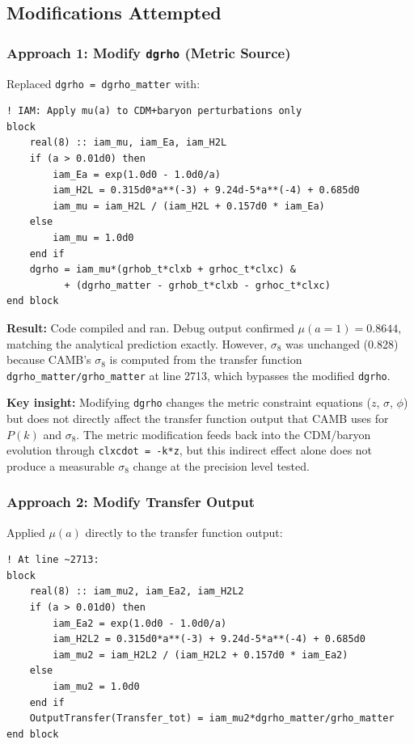 \documentclass[11pt,letterpaper]{article}
\begin{document}
\subsection{Modifications Attempted}

\subsubsection{Approach 1: Modify \texttt{dgrho} (Metric Source)}

Replaced \texttt{dgrho = dgrho\_matter} with:

\begin{lstlisting}
! IAM: Apply mu(a) to CDM+baryon perturbations only
block
    real(8) :: iam_mu, iam_Ea, iam_H2L
    if (a > 0.01d0) then
        iam_Ea = exp(1.0d0 - 1.0d0/a)
        iam_H2L = 0.315d0*a**(-3) + 9.24d-5*a**(-4) + 0.685d0
        iam_mu = iam_H2L / (iam_H2L + 0.157d0 * iam_Ea)
    else
        iam_mu = 1.0d0
    end if
    dgrho = iam_mu*(grhob_t*clxb + grhoc_t*clxc) &
          + (dgrho_matter - grhob_t*clxb - grhoc_t*clxc)
end block
\end{lstlisting}

\textbf{Result:} Code compiled and ran. Debug output confirmed $\mu(a=1) = 0.8644$, matching the analytical prediction exactly. However, $\sigma_8$ was unchanged (0.828) because CAMB's $\sigma_8$ is computed from the transfer function \texttt{dgrho\_matter/grho\_matter} at line 2713, which bypasses the modified \texttt{dgrho}.

\textbf{Key insight:} Modifying \texttt{dgrho} changes the metric constraint equations ($z$, $\sigma$, $\phi$) but does not directly affect the transfer function output that CAMB uses for $P(k)$ and $\sigma_8$. The metric modification feeds back into the CDM/baryon evolution through \texttt{clxcdot = -k*z}, but this indirect effect alone does not produce a measurable $\sigma_8$ change at the precision level tested.

\subsubsection{Approach 2: Modify Transfer Output}

Applied $\mu(a)$ directly to the transfer function output:

\begin{lstlisting}
! At line ~2713:
block
    real(8) :: iam_mu2, iam_Ea2, iam_H2L2
    if (a > 0.01d0) then
        iam_Ea2 = exp(1.0d0 - 1.0d0/a)
        iam_H2L2 = 0.315d0*a**(-3) + 9.24d-5*a**(-4) + 0.685d0
        iam_mu2 = iam_H2L2 / (iam_H2L2 + 0.157d0 * iam_Ea2)
    else
        iam_mu2 = 1.0d0
    end if
    OutputTransfer(Transfer_tot) = iam_mu2*dgrho_matter/grho_matter
end block
\end{lstlisting}
\end{document}

